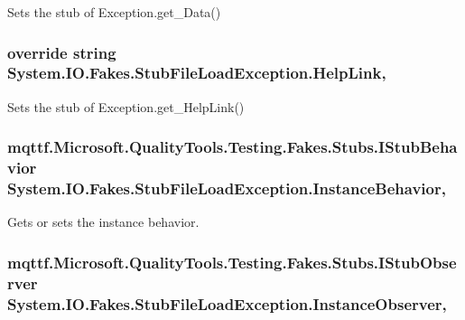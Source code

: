 Sets the stub of Exception.\-get\-\_\-\-Data()

\hypertarget{class_system_1_1_i_o_1_1_fakes_1_1_stub_file_load_exception_a920d7f509aef349a83c1499f0a02ea62}{
\subsubsection[{Help\-Link}]{\setlength{\rightskip}{0pt plus 5cm}override string System.\-I\-O.\-Fakes.\-Stub\-File\-Load\-Exception.\-Help\-Link\hspace{0.3cm}{\ttfamily [get]}, {\ttfamily [set]}}}\label{class_system_1_1_i_o_1_1_fakes_1_1_stub_file_load_exception_a920d7f509aef349a83c1499f0a02ea62}


Sets the stub of Exception.\-get\-\_\-\-Help\-Link()

\hypertarget{class_system_1_1_i_o_1_1_fakes_1_1_stub_file_load_exception_ad2af12902b47ed16f54e6e42b7c7b12e}{
\subsubsection[{Instance\-Behavior}]{\setlength{\rightskip}{0pt plus 5cm}mqttf.\-Microsoft.\-Quality\-Tools.\-Testing.\-Fakes.\-Stubs.\-I\-Stub\-Behavior System.\-I\-O.\-Fakes.\-Stub\-File\-Load\-Exception.\-Instance\-Behavior\hspace{0.3cm}{\ttfamily [get]}, {\ttfamily [set]}}}\label{class_system_1_1_i_o_1_1_fakes_1_1_stub_file_load_exception_ad2af12902b47ed16f54e6e42b7c7b12e}


Gets or sets the instance behavior.

\hypertarget{class_system_1_1_i_o_1_1_fakes_1_1_stub_file_load_exception_a69f13721596f07cc3921147bad03e729}{
\subsubsection[{Instance\-Observer}]{\setlength{\rightskip}{0pt plus 5cm}mqttf.\-Microsoft.\-Quality\-Tools.\-Testing.\-Fakes.\-Stubs.\-I\-Stub\-Observer System.\-I\-O.\-Fakes.\-Stub\-File\-Load\-Exception.\-Instance\-Observer\hspace{0.3cm}{\ttfamily [get]}, {\ttfamily [set]}}}\label{class_system_1_1_i_o_1_1_fakes_1_1_stub_file_load_exception_a69f13721596f07cc3921147bad03e729}


